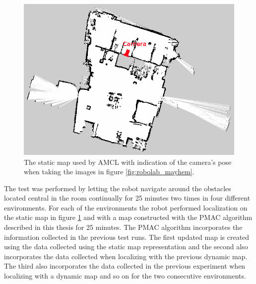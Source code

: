 \begin{figure}[tbph]
	\centering
	\includegraphics[width=0.7\linewidth]{chapters/evaluation/figures/Robolab1_clean_with_cam}
	\caption{The static map used by AMCL with indication of the camera's pose when taking the images in figure \ref{fig:robolab_mayhem}.}
	\label{fig:Robolab1_clean_with_cam}
\end{figure}

The test was performed by letting the robot navigate around the obstacles located central in the room continually for 25 minutes two times in four different environments. 
For each of the environments the robot performed localization on the static map in figure \ref{fig:Robolab1_clean_with_cam} and with a map constructed with the PMAC algorithm described in this thesis for 25 minutes. 
The PMAC algorithm incorporates the information collected in the previous test runs.
The first updated map is created using the data collected using the static map representation and the second also incorporates the data collected when localizing with the previous dynamic map. 
The third also incorporates the data collected in the previous experiment when localizing with a dynamic map and so on for the two consecutive environments.

